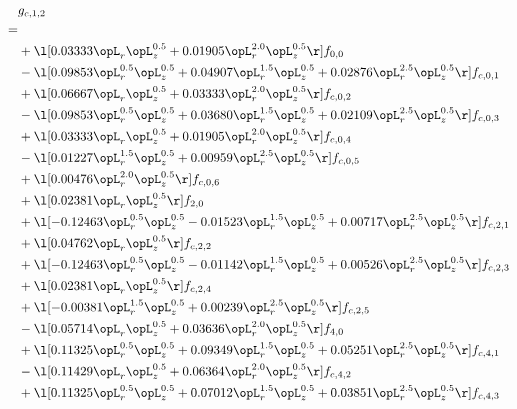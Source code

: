 \begin{alignat}{2} 
\label{eq:g_12_0} 
& g_{c,1,2} \nonumber \\ 
 = \\ 
& + \l[  0.03333 \opL_r \opL_z^{0.5} +  0.01905 \opL_r^{2.0} \opL_z^{0.5}  \r] f_{0,0} \nonumber \\ 
& - \l[  0.09853 \opL_r^{0.5} \opL_z^{0.5} +  0.04907 \opL_r^{1.5} \opL_z^{0.5} +  0.02876 \opL_r^{2.5} \opL_z^{0.5}  \r] f_{c,0,1} \nonumber \\ 
& + \l[  0.06667 \opL_r \opL_z^{0.5} +  0.03333 \opL_r^{2.0} \opL_z^{0.5}  \r] f_{c,0,2} \nonumber \\ 
& - \l[  0.09853 \opL_r^{0.5} \opL_z^{0.5} +  0.03680 \opL_r^{1.5} \opL_z^{0.5} +  0.02109 \opL_r^{2.5} \opL_z^{0.5}  \r] f_{c,0,3} \nonumber \\ 
& + \l[  0.03333 \opL_r \opL_z^{0.5} +  0.01905 \opL_r^{2.0} \opL_z^{0.5}  \r] f_{c,0,4} \nonumber \\ 
& - \l[  0.01227 \opL_r^{1.5} \opL_z^{0.5} +  0.00959 \opL_r^{2.5} \opL_z^{0.5}  \r] f_{c,0,5} \nonumber \\ 
& + \l[  0.00476 \opL_r^{2.0} \opL_z^{0.5}  \r] f_{c,0,6} \nonumber \\ 
& + \l[  0.02381 \opL_r \opL_z^{0.5}  \r] f_{2,0} \nonumber \\ 
& + \l[  -0.12463 \opL_r^{0.5} \opL_z^{0.5}   -0.01523 \opL_r^{1.5} \opL_z^{0.5} +  0.00717 \opL_r^{2.5} \opL_z^{0.5}  \r] f_{c,2,1} \nonumber \\ 
& + \l[  0.04762 \opL_r \opL_z^{0.5}  \r] f_{c,2,2} \nonumber \\ 
& + \l[  -0.12463 \opL_r^{0.5} \opL_z^{0.5}   -0.01142 \opL_r^{1.5} \opL_z^{0.5} +  0.00526 \opL_r^{2.5} \opL_z^{0.5}  \r] f_{c,2,3} \nonumber \\ 
& + \l[  0.02381 \opL_r \opL_z^{0.5}  \r] f_{c,2,4} \nonumber \\ 
& + \l[  -0.00381 \opL_r^{1.5} \opL_z^{0.5} +  0.00239 \opL_r^{2.5} \opL_z^{0.5}  \r] f_{c,2,5} \nonumber \\ 
& - \l[  0.05714 \opL_r \opL_z^{0.5} +  0.03636 \opL_r^{2.0} \opL_z^{0.5}  \r] f_{4,0} \nonumber \\ 
& + \l[  0.11325 \opL_r^{0.5} \opL_z^{0.5} +  0.09349 \opL_r^{1.5} \opL_z^{0.5} +  0.05251 \opL_r^{2.5} \opL_z^{0.5}  \r] f_{c,4,1} \nonumber \\ 
& - \l[  0.11429 \opL_r \opL_z^{0.5} +  0.06364 \opL_r^{2.0} \opL_z^{0.5}  \r] f_{c,4,2} \nonumber \\ 
& + \l[  0.11325 \opL_r^{0.5} \opL_z^{0.5} +  0.07012 \opL_r^{1.5} \opL_z^{0.5} +  0.03851 \opL_r^{2.5} \opL_z^{0.5}  \r] f_{c,4,3} \nonumber \\ 

\end{alignat}
